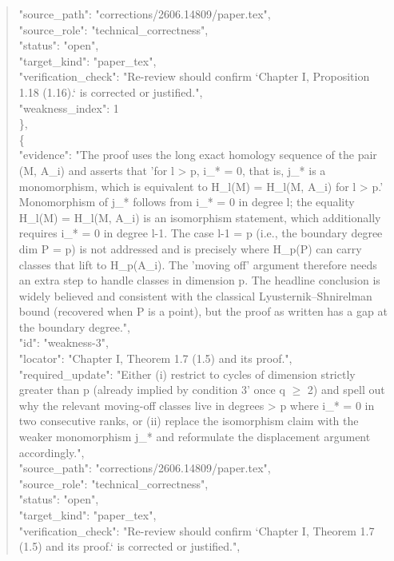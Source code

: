 \documentclass[11pt]{article}
\begin{document}
\begin{quote}
      "source\_path": "corrections/2606.14809/paper.tex",\\
      "source\_role": "technical\_correctness",\\
      "status": "open",\\
      "target\_kind": "paper\_tex",\\
      "verification\_check": "Re-review should confirm `Chapter I, Proposition 1.18 (1.16).` is corrected or justified.",\\
      "weakness\_index": 1\\
    \},\\
    \{\\
      "evidence": "The proof uses the long exact homology sequence of the pair (M, A\_i) and asserts that 'for l > p, i\_* = 0, that is, j\_* is a monomorphism, which is equivalent to H\_l(M) = H\_l(M, A\_i) for l > p.' Monomorphism of j\_* follows from i\_* = 0 in degree l; the equality H\_l(M) = H\_l(M, A\_i) is an isomorphism statement, which additionally requires i\_* = 0 in degree l-1. The case l-1 = p (i.e., the boundary degree dim P = p) is not addressed and is precisely where H\_p(P) can carry classes that lift to H\_p(A\_i). The 'moving off' argument therefore needs an extra step to handle classes in dimension p. The headline conclusion is widely believed and consistent with the classical Lyusternik--Shnirelman bound (recovered when P is a point), but the proof as written has a gap at the boundary degree.",\\
      "id": "weakness-3",\\
      "locator": "Chapter I, Theorem 1.7 (1.5) and its proof.",\\
      "required\_update": "Either (i) restrict to cycles of dimension strictly greater than p (already implied by condition 3' once q \ensuremath{\ge} 2) and spell out why the relevant moving-off classes live in degrees > p where i\_* = 0 in two consecutive ranks, or (ii) replace the isomorphism claim with the weaker monomorphism j\_* and reformulate the displacement argument accordingly.",\\
      "source\_path": "corrections/2606.14809/paper.tex",\\
      "source\_role": "technical\_correctness",\\
      "status": "open",\\
      "target\_kind": "paper\_tex",\\
      "verification\_check": "Re-review should confirm `Chapter I, Theorem 1.7 (1.5) and its proof.` is corrected or justified.",\\

\end{quote}
\end{document}
